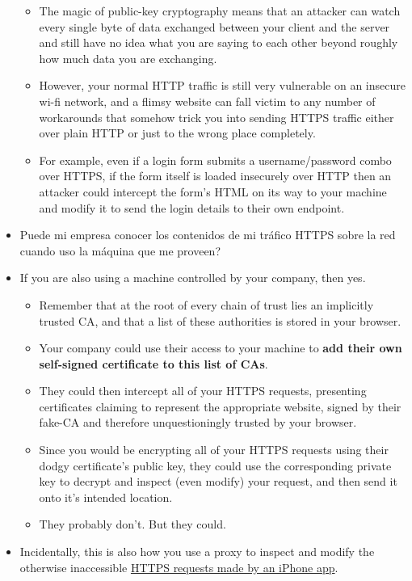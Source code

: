 \begin{itemize}
  \begin{itemize}
  \itemsep1pt\parskip0pt
  \item
    The magic of public-key cryptography means that an attacker can
    watch every single byte of data exchanged between your client and
    the server and still have no idea what you are saying to each other
    beyond roughly how much data you are exchanging.
  \item
    However, your normal HTTP traffic is still very vulnerable on an
    insecure wi-fi network, and a flimsy website can fall victim to any
    number of workarounds that somehow trick you into sending HTTPS
    traffic either over plain HTTP or just to the wrong place
    completely.
  \item
    For example, even if a login form submits a username/password combo
    over HTTPS, if the form itself is loaded insecurely over HTTP then
    an attacker could intercept the form's HTML on its way to your
    machine and modify it to send the login details to their own
    endpoint.
  \end{itemize}
\item
  Puede mi empresa conocer los contenidos de mi tráfico HTTPS sobre la
  red cuando uso la máquina que me proveen?
\item
  If you are also using a machine controlled by your company, then yes.

  \begin{itemize}
  \itemsep1pt\parskip0pt
  \item
    Remember that at the root of every chain of trust lies an implicitly
    trusted CA, and that a list of these authorities is stored in your
    browser.
  \item
    Your company could use their access to your machine to \textbf{add
    their own self-signed certificate to this list of CAs}.
  \item
    They could then intercept all of your HTTPS requests, presenting
    certificates claiming to represent the appropriate website, signed
    by their fake-CA and therefore unquestioningly trusted by your
    browser.
  \item
    Since you would be encrypting all of your HTTPS requests using their
    dodgy certificate's public key, they could use the corresponding
    private key to decrypt and inspect (even modify) your request, and
    then send it onto it's intended location.
  \item
    They probably don't. But they could.
  \end{itemize}
\item
  Incidentally, this is also how you use a proxy to inspect and modify
  the otherwise inaccessible
  \href{http://nickfishman.com/post/50557873036/reverse-engineering-native-apps-by-intercepting-network}{HTTPS
  requests made by an iPhone app}.
\end{itemize}
